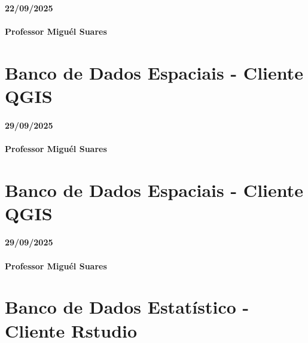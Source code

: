 \documentclass[
]{book}
\begin{document}
\subsubsection*{22/09/2025}\label{section-10}

\subsubsection*{Professor Miguél Suares}\label{professor-miguuxe9l-suares-10}

\chapter{Banco de Dados Espaciais - Cliente QGIS}\label{banco-de-dados-espaciais---cliente-qgis}

\subsubsection*{29/09/2025}\label{section-11}

\subsubsection*{Professor Miguél Suares}\label{professor-miguuxe9l-suares-11}

\chapter{Banco de Dados Espaciais - Cliente QGIS}\label{banco-de-dados-espaciais---cliente-qgis-1}

\subsubsection*{29/09/2025}\label{section-12}

\subsubsection*{Professor Miguél Suares}\label{professor-miguuxe9l-suares-12}

\chapter{Banco de Dados Estatístico - Cliente Rstudio}\label{banco-de-dados-estatuxedstico---cliente-rstudio}
\end{document}
